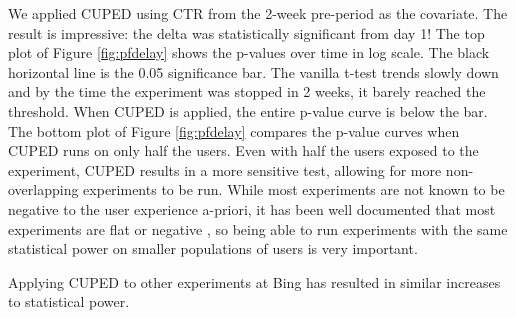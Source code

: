 \documentclass{sig-alternate}
\begin{document}
We applied CUPED using CTR from the 2-week pre-period as the covariate. The result is impressive: the delta was statistically significant from day 1!  The top plot of Figure \ref{fig:pfdelay} shows the p-values over time in log scale. The black horizontal line is the 0.05 significance bar. The vanilla t-test trends slowly down and by the time the experiment was stopped in 2 weeks, it barely reached the threshold. When CUPED is applied, the entire p-value curve is below the bar. The bottom plot of Figure \ref{fig:pfdelay} compares the p-value curves when CUPED runs on only half the users. 
Even with half the users exposed to the experiment, CUPED results in a more sensitive test, allowing for more non-overlapping experiments to be run.   While most experiments are not known to be negative to the user experience a-priori, it has been well documented that most experiments are flat or negative \citep{expAtMicrosoft, Manzi}, so being able to run experiments with the same statistical power on smaller populations of users is very important.

Applying CUPED to other experiments at Bing has resulted in similar increases to statistical power.

\end{document}
